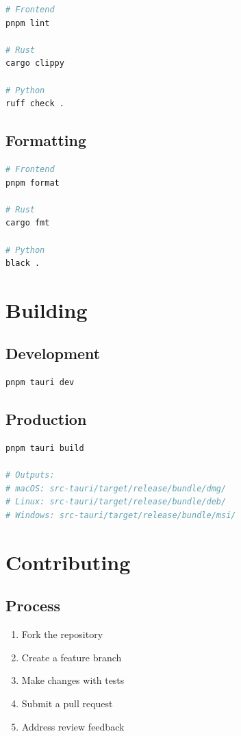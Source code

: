 \begin{lstlisting}[language=bash]
# Frontend
pnpm lint

# Rust
cargo clippy

# Python
ruff check .
\end{lstlisting}

\subsection{Formatting}

\begin{lstlisting}[language=bash]
# Frontend
pnpm format

# Rust
cargo fmt

# Python
black .
\end{lstlisting}

\section{Building}

\subsection{Development}

\begin{lstlisting}[language=bash]
pnpm tauri dev
\end{lstlisting}

\subsection{Production}

\begin{lstlisting}[language=bash]
pnpm tauri build

# Outputs:
# macOS: src-tauri/target/release/bundle/dmg/
# Linux: src-tauri/target/release/bundle/deb/
# Windows: src-tauri/target/release/bundle/msi/
\end{lstlisting}

\section{Contributing}

\subsection{Process}

\begin{enumerate}
    \item Fork the repository
    \item Create a feature branch
    \item Make changes with tests
    \item Submit a pull request
    \item Address review feedback
\end{enumerate}

